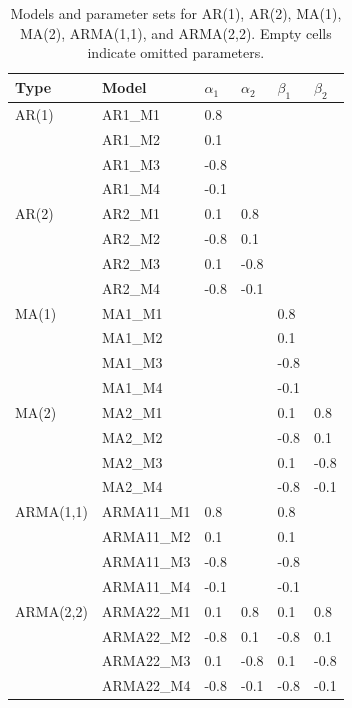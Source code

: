\documentclass[12pt,a4paper]{article}
\begin{document}
\begin{table}[h!]
	\centering
	\begin{tabular}{llllll}
		\toprule
		\textbf{Type} & \textbf{Model} & $\alpha_1$ & $\alpha_2$ & $\beta_1$ & $\beta_2$ \\
		\midrule
		AR(1)      & AR1\_M1  & 0.8   &      &      &      \\
		& AR1\_M2  & 0.1   &      &      &      \\
		& AR1\_M3  & -0.8  &      &      &      \\
		& AR1\_M4  & -0.1  &      &      &      \\
		AR(2)      & AR2\_M1  & 0.1   & 0.8  &      &      \\
		& AR2\_M2  & -0.8  & 0.1  &      &      \\
		& AR2\_M3  & 0.1   & -0.8 &      &      \\
		& AR2\_M4  & -0.8  & -0.1 &      &      \\
		MA(1)      & MA1\_M1  &       &      & 0.8  &      \\
		& MA1\_M2  &       &      & 0.1  &      \\
		& MA1\_M3  &       &      & -0.8 &      \\
		& MA1\_M4  &       &      & -0.1 &      \\
		MA(2)      & MA2\_M1  &       &      & 0.1  & 0.8  \\
		& MA2\_M2  &       &      & -0.8 & 0.1  \\
		& MA2\_M3  &       &      & 0.1  & -0.8 \\
		& MA2\_M4  &       &      & -0.8 & -0.1 \\
		ARMA(1,1)  & ARMA11\_M1 & 0.8 &      & 0.8  &      \\
		& ARMA11\_M2 & 0.1 &      & 0.1  &      \\
		& ARMA11\_M3 & -0.8 &     & -0.8 &      \\
		& ARMA11\_M4 & -0.1 &     & -0.1 &      \\
		ARMA(2,2)  & ARMA22\_M1 & 0.1 & 0.8  & 0.1  & 0.8  \\
		& ARMA22\_M2 & -0.8 & 0.1 & -0.8 & 0.1  \\
		& ARMA22\_M3 & 0.1 & -0.8 & 0.1  & -0.8 \\
		& ARMA22\_M4 & -0.8 & -0.1 & -0.8 & -0.1 \\
		\bottomrule
	\end{tabular}
	\caption{Models and parameter sets for AR(1), AR(2), MA(1), MA(2), ARMA(1,1), and ARMA(2,2). Empty cells indicate omitted parameters.}
\end{table}
\end{document}

